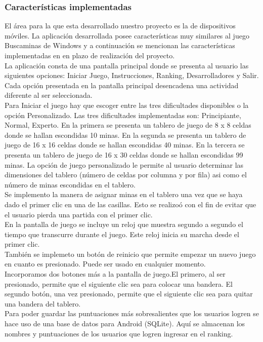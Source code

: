 \documentclass[11pt]{article} %
\begin{document}
\subsubsection{Caracter\' isticas implementadas}
El \'area para la que esta desarrollado nuestro proyecto es la de dispositivos m\'oviles.
La aplicaci\'on desarrollada posee caracter\'isticas muy similares al juego Buscaminas de Windows y a continuaci\'on se mencionan las caracter\'isticas implementadas en en plazo de realizaci\'on del proyecto.
\\La aplicaci\'on consta de una pantalla principal  donde se presenta al usuario las siguientes opciones: Iniciar Juego, Instrucciones, Ranking, Desarrolladores y Salir. Cada opci\'on presentada en la pantalla principal desencadena una actividad diferente al ser seleccionada.
\\Para Iniciar el juego hay que escoger entre las tres dificultades disponibles o la opci\'on Personalizado. Las tres dificultades implementadas son: Principiante, Normal, Experto. En la primera se presenta un tablero de juego de 8 x 8 celdas donde se hallan escondidas 10 minas. En la segunda se presenta un tablero de juego de 16 x 16 celdas donde se hallan escondidas 40 minas. En la tercera se presenta un tablero de juego de 16 x 30 celdas donde se hallan escondidas 99 minas. La opci\'on de juego personalizado le permite al usuario determinar las dimensiones del tablero (n\'umero de celdas por columna y por fila) asi como el n\'umero de minas escondidas en el tablero.
\\Se implemento la manera de asignar minas en el tablero una vez que se haya dado el primer clic en una de las casillas. Esto se realizo\' o con el fin de evitar que el usuario pierda una partida con el primer clic.
\\En la pantalla de juego se incluye un reloj que muestra segundo a segundo el tiempo que transcurre durante el juego. Este reloj inicia su marcha desde el primer clic.
\\Tambi\'en se implemeto un bot\' on de reinicio que permite empezar un nuevo juego en cuanto es presionado. Puede ser usado en cualquier momento.
\\Incorporamos dos botones m\'as a la pantalla de juego.El primero, al ser presionado, permite que el siguiente clic sea para colocar una bandera. El segundo bot\' on, una vez presionado, permite que el siguiente clic sea para quitar una bandera del tablero.
\\Para poder guardar las puntuaciones m\' as sobresalientes que los usuarios logren se hace uso de una base de datos para Android (SQLite). Aqu\' i se almacenan los nombres y puntuaciones de los usuarios que logren ingresar en el ranking.
\end{document}
